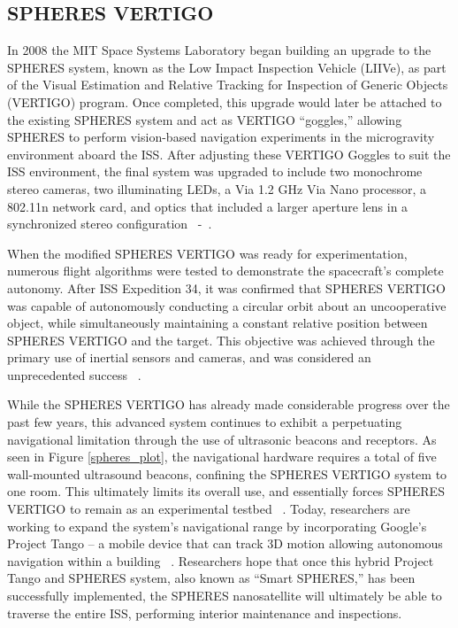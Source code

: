 \documentclass[journal, 10pt]{IEEEtran}
\begin{document}
\subsection{SPHERES VERTIGO}

In 2008 the MIT Space Systems Laboratory began building an upgrade to the SPHERES system, known as the Low Impact Inspection Vehicle (LIIVe), as part of the Visual Estimation and Relative Tracking for Inspection of Generic Objects (VERTIGO) program. Once completed, this upgrade would later be attached to the existing SPHERES system and act as VERTIGO ``goggles,'' allowing SPHERES to perform vision-based navigation experiments in the microgravity environment aboard the ISS. After adjusting these VERTIGO Goggles to suit the ISS environment, the final system was upgraded to include two monochrome stereo cameras, two illuminating LEDs, a Via 1.2 GHz Via Nano processor, a 802.11n network card, and optics that included a larger aperture lens in a synchronized stereo configuration ~\cite{SPHERES}-~\cite{Vertigo3}.

When the modified SPHERES VERTIGO was ready for experimentation, numerous flight algorithms were tested to demonstrate the spacecraft's complete autonomy. After ISS Expedition 34, it was confirmed that SPHERES VERTIGO was capable of autonomously conducting a circular orbit about an uncooperative object, while simultaneously maintaining a constant relative position between SPHERES VERTIGO and the target. This objective was achieved through the primary use of inertial sensors and cameras, and was considered an unprecedented success ~\cite{Vertigo2, Vertigo3}.

While the SPHERES VERTIGO has already made considerable progress over the past few years, this advanced system continues to exhibit a perpetuating navigational limitation through the use of ultrasonic beacons and receptors.  As seen in Figure \ref{spheres_plot}, the navigational hardware requires a total of five wall-mounted ultrasound beacons, confining the SPHERES VERTIGO system to one room. This ultimately  limits its overall use, and essentially forces SPHERES VERTIGO to remain as an experimental testbed ~\cite{SPHERES, Vertigo 1, Vertigo2, Vertigo3}. Today, researchers are working to expand the system's navigational range by incorporating Google's Project Tango -- a mobile device that can track 3D motion allowing autonomous navigation within a building ~\cite{Tango}. Researchers hope that once this hybrid Project Tango and SPHERES system, also known as ``Smart SPHERES,'' has been successfully implemented, the SPHERES nanosatellite will ultimately be able to traverse the entire ISS, performing interior maintenance and inspections.
\end{document}
